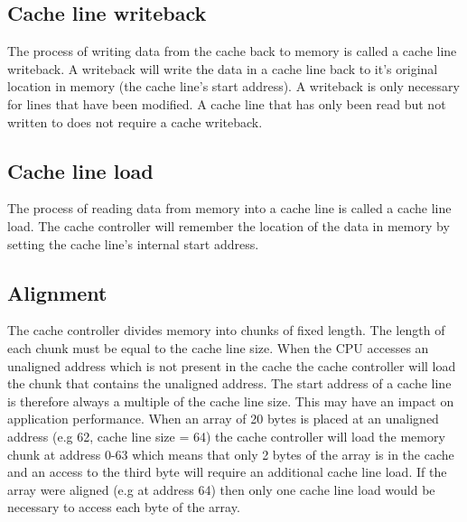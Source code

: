 \subsection{Cache line writeback}

The process of writing data from the cache back to memory is called a cache line writeback. A writeback will write the data in a cache line back to it's original location in memory (the cache line's start address). A writeback is only necessary for lines that have been modified. A cache line that has only been read but not written to does not require a cache writeback.


\subsection{Cache line load}

The process of reading data from memory into a cache line is called a cache line load. The cache controller will remember the location of the data in memory by setting the cache line's internal start address. 

\subsection{Alignment}

The cache controller divides memory into chunks of fixed length. The length of each chunk must be equal to the cache line size. When the CPU accesses an unaligned address which is not present in the cache the cache controller will load the chunk that contains the unaligned address. The start address of a cache line is therefore always a multiple of the cache line size. This may have an impact on application performance. When an array of 20 bytes is placed at an unaligned address (e.g 62, cache line size = 64) the cache controller will load the memory chunk at address 0-63 which means that only 2 bytes of the array is in the cache and an access to the third byte will require an additional cache line load. If the array were aligned (e.g at address 64) then only one cache line load would be necessary to access each byte of the array. 
